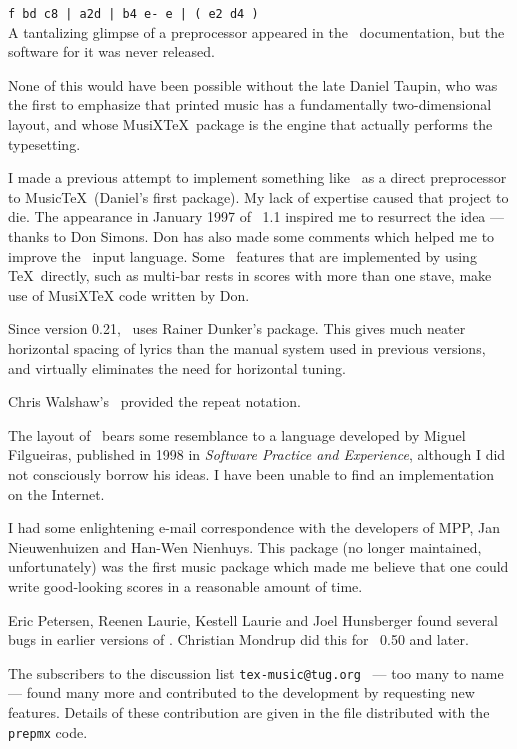 \documentclass[11pt]{article}
\makeatletter
\newcommand{\mailingList}{
\texttt{tex-music@tug.org}
}
\makeatother
\begin{document}
\verb"f bd c8 | a2d | b4 e- e | ( e2 d4 )" \\
A tantalizing glimpse of a preprocessor appeared in the \mutex\ 
documentation, but the software for it was never released.  

None of this would have been possible without the late Daniel Taupin, 
who was the first to emphasize that printed music has a fundamentally 
two-dimensional layout, and whose MusiX\TeX\ package is the engine that 
actually performs the typesetting.

I made a previous attempt to implement something like \MTx\ as a direct 
preprocessor to Music\TeX\ (Daniel's first package).  My lack of 
expertise caused that project to die.  The appearance in January 1997 of 
\PMX\ 1.1 inspired me to resurrect the idea --- thanks to Don Simons. 
Don has also made some comments which helped me to improve the \MTx\ 
input language.  Some \MTx\ features that are implemented by using \TeX\ directly, 
such as multi-bar rests in scores with more than one stave, make use of
MusiXTeX code written by Don.

Since version 0.21, \MTx\ uses Rainer Dunker's  package.  
This gives much neater horizontal spacing of lyrics than the manual system 
used in previous versions, and virtually eliminates the need for 
horizontal tuning. 

Chris Walshaw's \ABC\ provided the repeat notation.  

The layout of \MTx\ bears some resemblance to a language developed by 
Miguel Filgueiras, published in 1998 in \textit{Software Practice and
Experience}, although I did not consciously borrow his ideas. I have
been unable to find an implementation on the Internet.

I had some enlightening e-mail correspondence with the developers of 
MPP, Jan Nieuwenhuizen and Han-Wen Nienhuys. 
This package (no longer maintained, unfortunately) was the first 
music package which made me believe that one could write good-looking 
scores in a reasonable amount of time. 

Eric Petersen, Reenen Laurie, Kestell Laurie and Joel Hunsberger found
several bugs in earlier versions of \MTx.  Christian Mondrup did this for 
\MTx\ 0.50 and later.  

The subscribers to the discussion list \mailingList\ --- 
too many to name --- found many more and contributed to the development by 
requesting new features.  Details of these contribution are given in the
\ttxem{Corrections} file distributed with the \texttt{prepmx} code.
\end{document}
